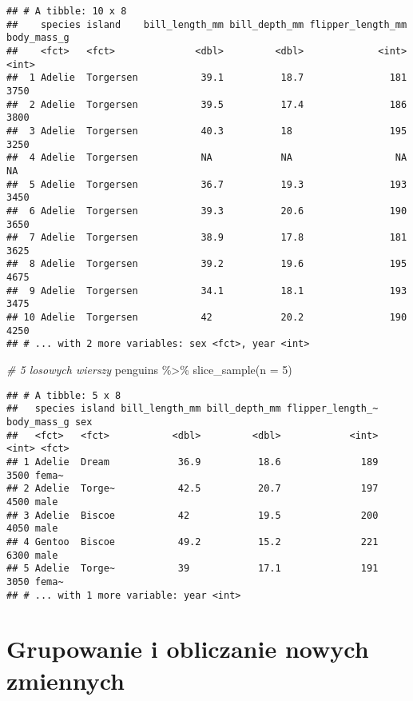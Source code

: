 \documentclass[
]{book}
\newenvironment{Shaded}{\begin{snugshade}}{\end{snugshade}}
\newcommand{\AttributeTok}[1]{\textcolor[rgb]{0.77,0.63,0.00}{#1}}
\newcommand{\CommentTok}[1]{\textcolor[rgb]{0.56,0.35,0.01}{\textit{#1}}}
\newcommand{\DecValTok}[1]{\textcolor[rgb]{0.00,0.00,0.81}{#1}}
\newcommand{\FunctionTok}[1]{\textcolor[rgb]{0.00,0.00,0.00}{#1}}
\newcommand{\NormalTok}[1]{#1}
\newcommand{\SpecialCharTok}[1]{\textcolor[rgb]{0.00,0.00,0.00}{#1}}
\begin{document}
\begin{verbatim}
## # A tibble: 10 x 8
##    species island    bill_length_mm bill_depth_mm flipper_length_mm body_mass_g
##    <fct>   <fct>              <dbl>         <dbl>             <int>       <int>
##  1 Adelie  Torgersen           39.1          18.7               181        3750
##  2 Adelie  Torgersen           39.5          17.4               186        3800
##  3 Adelie  Torgersen           40.3          18                 195        3250
##  4 Adelie  Torgersen           NA            NA                  NA          NA
##  5 Adelie  Torgersen           36.7          19.3               193        3450
##  6 Adelie  Torgersen           39.3          20.6               190        3650
##  7 Adelie  Torgersen           38.9          17.8               181        3625
##  8 Adelie  Torgersen           39.2          19.6               195        4675
##  9 Adelie  Torgersen           34.1          18.1               193        3475
## 10 Adelie  Torgersen           42            20.2               190        4250
## # ... with 2 more variables: sex <fct>, year <int>
\end{verbatim}

\begin{Shaded}
\begin{Highlighting}[]
\CommentTok{\# 5 losowych wierszy}
\NormalTok{penguins }\SpecialCharTok{\%\textgreater{}\%} \FunctionTok{slice\_sample}\NormalTok{(}\AttributeTok{n =} \DecValTok{5}\NormalTok{)}
\end{Highlighting}
\end{Shaded}

\begin{verbatim}
## # A tibble: 5 x 8
##   species island bill_length_mm bill_depth_mm flipper_length_~ body_mass_g sex  
##   <fct>   <fct>           <dbl>         <dbl>            <int>       <int> <fct>
## 1 Adelie  Dream            36.9          18.6              189        3500 fema~
## 2 Adelie  Torge~           42.5          20.7              197        4500 male 
## 3 Adelie  Biscoe           42            19.5              200        4050 male 
## 4 Gentoo  Biscoe           49.2          15.2              221        6300 male 
## 5 Adelie  Torge~           39            17.1              191        3050 fema~
## # ... with 1 more variable: year <int>
\end{verbatim}

\hypertarget{grupowanie-i-obliczanie-nowych-zmiennych}{%
\section{Grupowanie i obliczanie nowych zmiennych}\label{grupowanie-i-obliczanie-nowych-zmiennych}}
\end{document}
